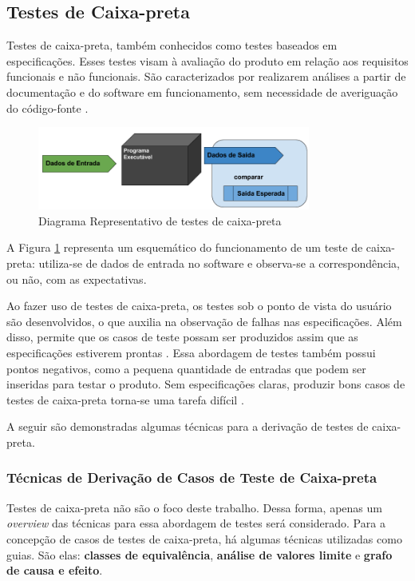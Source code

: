 \subsection{Testes de Caixa-preta}
Testes de caixa-preta, também conhecidos como testes baseados em especificações. Esses testes visam à avaliação do produto em relação aos requisitos funcionais e não funcionais. São caracterizados por realizarem análises a partir de documentação e do software em funcionamento, sem necessidade de averiguação do código-fonte \cite{barbosaEtAl2009}.

\begin{figure}[h]
  \centering
    \includegraphics[width=0.8\textwidth]{figuras/test_black_box.png}
    \caption{Diagrama Representativo de testes de caixa-preta}
    \label{test_black_box}
\end{figure}

A Figura \ref{test_black_box} representa um esquemático do funcionamento de um teste de caixa-preta: utiliza-se de dados de entrada no software e observa-se a correspondência, ou não, com as expectativas.
\par
\indent Ao fazer uso de testes de caixa-preta, os testes sob o ponto de vista do usuário são desenvolvidos, o que auxilia na observação de falhas nas especificações. Além disso, permite que os casos de teste possam ser produzidos assim que as especificações estiverem prontas \cite{stf2010}. Essa abordagem de testes também possui pontos negativos, como a pequena quantidade de entradas que podem ser inseridas para testar o produto. Sem especificações claras, produzir bons casos de testes de caixa-preta torna-se uma tarefa difícil \cite{stf2010}.
\par
\indent A seguir são demonstradas algumas técnicas para a derivação de testes de caixa-preta.

\subsubsection{Técnicas de Derivação de Casos de Teste de Caixa-preta}
Testes de caixa-preta não são o foco deste trabalho. Dessa forma, apenas um \textit{overview} das técnicas para essa abordagem de testes será considerado. Para a concepção de casos de testes de caixa-preta, há algumas técnicas utilizadas como guias. São elas: \textbf{classes de equivalência}, \textbf{análise de valores limite} e \textbf{grafo de causa e efeito}.

